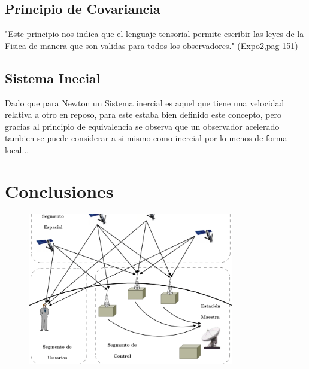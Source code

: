 \documentclass[12pt,twoside]{rif}
\begin{document}
	\subsection{Principio de Covariancia}
	"Este principio nos indica que el lenguaje tensorial permite escribir las leyes de la Fisica de manera que son validas para todos los observadores." (Expo2,pag 151)
	\subsection{Sistema Inecial}
	Dado que para Newton un Sistema inercial es aquel que tiene una velocidad relativa a otro en reposo, para este estaba bien definido este concepto, pero gracias al principio de equivalencia se observa que un observador acelerado tambien se puede considerar a si mismo como inercial por lo menos de forma local...
	\section{Conclusiones}
\begin{center}
\begin{figure}
\includegraphics[width=0.8\textwidth]{img/GPS.png}
\end{figure}
\end{center}
	\nocite{*}
	
	
	
\end{document}
